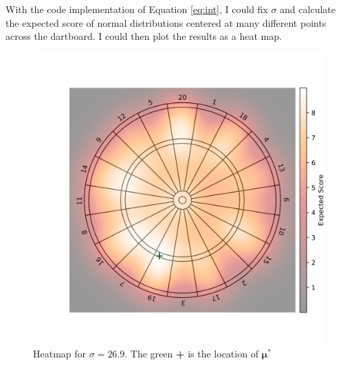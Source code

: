 \documentclass[]{article}
\begin{document}
With the code implementation of Equation \ref{eq:int}, I could fix $\sigma$ and calculate the expected score of normal distributions centered at many different points across the dartboard. I could then plot the results as a heat map.

\begin{figure}[h]
	\centering
	\includegraphics[width=\textwidth]{../images/gist_hear.png}
	\caption{Heatmap for $\sigma = 26.9$. The green \textbf{+} is the location of  $\mathbf{\mu^*}$}
\end{figure}






	

\printbibliography
\end{document}
